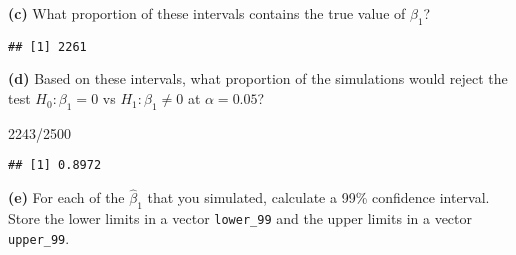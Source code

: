 \documentclass[
]{article}
\newenvironment{Shaded}{\begin{snugshade}}{\end{snugshade}}
\newcommand{\AttributeTok}[1]{\textcolor[rgb]{0.77,0.63,0.00}{#1}}
\newcommand{\DecValTok}[1]{\textcolor[rgb]{0.00,0.00,0.81}{#1}}
\newcommand{\FloatTok}[1]{\textcolor[rgb]{0.00,0.00,0.81}{#1}}
\newcommand{\FunctionTok}[1]{\textcolor[rgb]{0.00,0.00,0.00}{#1}}
\newcommand{\NormalTok}[1]{#1}
\newcommand{\OtherTok}[1]{\textcolor[rgb]{0.56,0.35,0.01}{#1}}
\newcommand{\SpecialCharTok}[1]{\textcolor[rgb]{0.00,0.00,0.00}{#1}}
\begin{document}
\textbf{(c)} What proportion of these intervals contains the true value
of \(\beta_1\)?

\begin{Shaded}
\end{Shaded}

\begin{verbatim}
## [1] 2261
\end{verbatim}

\textbf{(d)} Based on these intervals, what proportion of the
simulations would reject the test \(H_0: \beta_1 = 0\) vs
\(H_1: \beta_1 \neq 0\) at \(\alpha = 0.05\)?

\begin{Shaded}
\begin{Highlighting}[]
\DecValTok{2243}\SpecialCharTok{/}\DecValTok{2500}
\end{Highlighting}
\end{Shaded}

\begin{verbatim}
## [1] 0.8972
\end{verbatim}

\textbf{(e)} For each of the \(\hat{\beta}_1\) that you simulated,
calculate a 99\% confidence interval. Store the lower limits in a vector
\texttt{lower\_99} and the upper limits in a vector \texttt{upper\_99}.

\begin{Shaded}
\end{Shaded}
\end{document}
